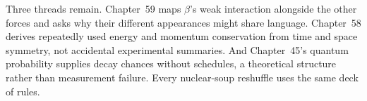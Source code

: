 Three threads remain. Chapter~59 maps \(\beta\)'s weak interaction alongside the other forces and asks why their different appearances might share language. Chapter~58 derives repeatedly used energy and momentum conservation from time and space symmetry, not accidental experimental summaries. And Chapter~45's quantum probability supplies decay chances without schedules, a theoretical structure rather than measurement failure. Every nuclear-soup reshuffle uses the same deck of rules.
